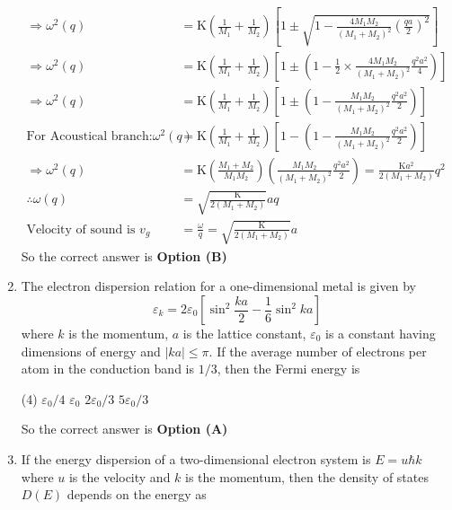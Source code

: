 \begin{enumerate}
\begin{answer}
\begin{align*}
		\Rightarrow \omega^{2}(q)&=\mathrm{K}\left(\frac{1}{M_{1}}+\frac{1}{M_{2}}\right)\left[1 \pm \sqrt{1-\frac{4 M_{1} M_{2}}{\left(M_{1}+M_{2}\right)^{2}}\left(\frac{q a}{2}\right)^{2}}\right]\\
		\Rightarrow \omega^{2}(q)&=\mathrm{K}\left(\frac{1}{M_{1}}+\frac{1}{M_{2}}\right)\left[1 \pm\left(1-\frac{1}{2} \times \frac{4 M_{1} M_{2}}{\left(M_{1}+M_{2}\right)^{2}} \frac{q^{2} a^{2}}{4}\right)\right]\\
		\Rightarrow \omega^{2}(q)&=\mathrm{K}\left(\frac{1}{M_{1}}+\frac{1}{M_{2}}\right)\left[1 \pm\left(1-\frac{M_{1} M_{2}}{\left(M_{1}+M_{2}\right)^{2}} \frac{q^{2} a^{2}}{2}\right)\right]\\
		\text{For Acoustical branch:} \omega^{2}(q)&=\mathrm{K}\left(\frac{1}{M_{1}}+\frac{1}{M_{2}}\right)\left[1-\left(1-\frac{M_{1} M_{2}}{\left(M_{1}+M_{2}\right)^{2}} \frac{q^{2} a^{2}}{2}\right)\right]\\
		\Rightarrow \omega^{2}(q)&=\mathrm{K}\left(\frac{M_{1}+M_{2}}{M_{1} M_{2}}\right)\left(\frac{M_{1} M_{2}}{\left(M_{1}+M_{2}\right)^{2}} \frac{q^{2} a^{2}}{2}\right)=\frac{\mathrm{K} a^{2}}{2\left(M_{1}+M_{2}\right)} q^{2}\\
		\therefore \omega(q)&=\sqrt{\frac{\mathrm{K}}{2\left(M_{1}+M_{2}\right)}} a q\\
		\text{Velocity of sound is } v_{g}&=\frac{\omega}{q}=\sqrt{\frac{\mathrm{K}}{2\left(M_{1}+M_{2}\right)}} a
		\end{align*}
		So the correct answer is \textbf{Option (B)}
	\end{answer}
	\item The electron dispersion relation for a one-dimensional metal is given by
	$$
	\varepsilon_{k}=2 \varepsilon_{0}\left[\sin ^{2} \frac{k a}{2}-\frac{1}{6} \sin ^{2} k a\right]
	$$
	where $k$ is the momentum, $a$ is the lattice constant, $\varepsilon_{0}$ is a constant having dimensions of energy and $|k a| \leq \pi .$ If the average number of electrons per atom in the conduction band is $1 / 3$, then the Fermi energy is
	{}
	\begin{tasks}(4)
		\task[\textbf{A.}] $\varepsilon_{0} / 4$
		\task[\textbf{B.}]  $\varepsilon_{0}$
		\task[\textbf{C.}] $2 \varepsilon_{0} / 3$
		\task[\textbf{D.}] $5 \varepsilon_{0} / 3$
	\end{tasks}
	\begin{answer}
		So the correct answer is \textbf{Option (A)}
	\end{answer}
	\item If the energy dispersion of a two-dimensional electron system is $E=u \hbar k$ where $u$ is the velocity and $k$ is the momentum, then the density of states $D(E)$ depends on the energy as

\end{enumerate}
